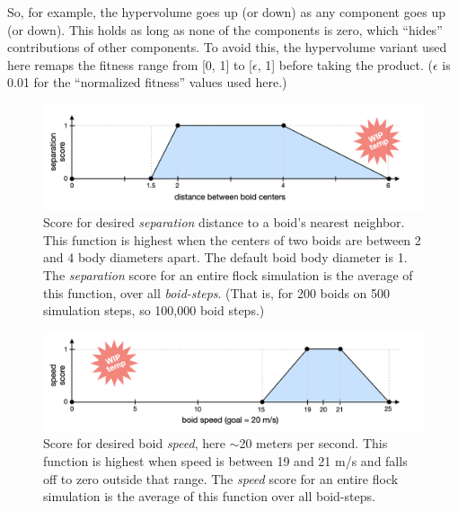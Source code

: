 \documentclass[letterpaper]{article}
\begin{document}
So, for example, the hypervolume goes up (or down) as any component goes up (or down). This holds as long as none of the components is zero, which ``hides'' contributions of other components. To avoid this, the hypervolume variant used here remaps the fitness range from [0, 1] to [$\epsilon$, 1] before taking the product. ($\epsilon$ is 0.01 for the ``normalized fitness'' values used here.)


\begin{figure}[]
    \centering
    \includegraphics[width=0.9\linewidth]{images/temp_sep_score.png}
    \caption{Score for desired \textit{separation} distance to a boid's nearest neighbor. This function is highest when the centers of two boids are between 2 and 4 body diameters apart. The default boid body diameter is 1. The \textit{separation} score for an entire flock simulation is the average of this function, over all \textit{boid-steps}. (That is, for 200 boids on 500 simulation steps, so 100,000 boid steps.)}
    \label{fig:SeparationScore}
\end{figure}


\begin{figure}[]
    \centering
    \includegraphics[width=0.9\linewidth]{images/temp_speed_score.png}
    \caption{Score for desired boid \textit{speed}, here $\sim$20 meters per second. This function is highest when speed is between 19 and 21 m/s and falls off to zero outside that range. The \textit{speed} score for an entire flock simulation is the average of this function over all boid-steps.}
    \label{fig:speed_score}
\end{figure}
\end{document}
